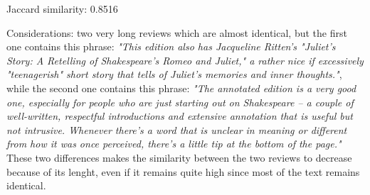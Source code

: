 \documentclass[12pt, a4paper]{article}
\begin{document}
\begin{itemize}
{    \item Jaccard similarity: 0.8516
    \item Considerations: two very long reviews which are almost identical, but the first one contains this phrase: \textit{"This edition also has Jacqueline Ritten's "Juliet's Story: A Retelling of Shakespeare's Romeo and Juliet," a rather nice if excessively "teenagerish" short story that tells of Juliet's memories and inner thoughts."}, while the second one contains this phrase: \textit{"The annotated edition is a very good one, especially for people who are just starting out on Shakespeare -- a couple of well-written, respectful introductions and extensive annotation that is useful but not intrusive. Whenever there's a word that is unclear in meaning or different from how it was once perceived, there's a little tip at the bottom of the page."} These two differences makes the similarity between the two reviews to decrease because of its lenght, even if it remains quite high since most of the text remains identical.
    }
\end{itemize}
\dotfill
\end{document}
